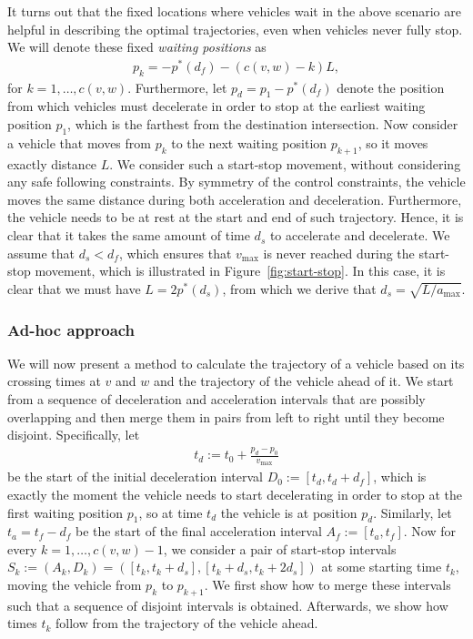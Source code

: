\documentclass[a4paper]{article}
\theoremstyle{definition}
\theoremstyle{plain}
\begin{document}
It turns out that the fixed locations where vehicles wait in the above scenario
are helpful in describing the optimal trajectories, even when vehicles never
fully stop. We will denote these fixed \textit{waiting positions} as
\begin{align*}
  p_{k} = - p^{*}(d_{f}) - (c(v,w) - k) L,
\end{align*}
for $k = 1, \dots, c(v,w)$.
%
Furthermore, let $p_{d} = p_{1} - p^{*}(d_{f})$ denote the position from
which vehicles must decelerate in order to stop at the earliest waiting position
$p_{1}$, which is the farthest from the destination intersection.
%
Now consider a vehicle that moves from $p_{k}$ to the next waiting position
$p_{k+1}$, so it moves exactly distance $L$. We consider such a start-stop
movement, without considering any safe following constraints. By symmetry of the
control constraints, the vehicle moves the same distance during both
acceleration and deceleration. Furthermore, the vehicle needs to be at rest at
the start and end of such trajectory. Hence, it is clear that it takes the same
amount of time $d_{s}$ to accelerate and decelerate. We assume that
$d_{s} < d_{f}$, which ensures that $v_{\max}$ is never reached during the
start-stop movement, which is illustrated in Figure~\ref{fig:start-stop}. In this case, it is
clear that we must have $L = 2 p^{*}(d_{s})$, from which we derive that
$d_{s} = \sqrt{L / a_{\max}}$.

\subsubsection{Ad-hoc approach}
We will now present a method to calculate the trajectory of a vehicle based on
its crossing times at $v$ and $w$ and the trajectory of the vehicle ahead of it.
We start from a sequence of deceleration and acceleration intervals that are
possibly overlapping and then merge them in pairs from left to right until they
become disjoint.
%
Specifically, let
\begin{align*}
  t_{d} := t_{0} + \frac{p_{d} - p_{0}}{v_{\max}}
\end{align*}
be the start of the initial deceleration interval
$D_{0} := [t_{d}, t_{d} + d_{f}]$, which is exactly the moment the vehicle needs
to start decelerating in order to stop at the first waiting position $p_{1}$, so
at time $t_{d}$ the vehicle is at position $p_{d}$. Similarly, let
$t_{a} = t_{f} - d_{f}$ be the start of the final acceleration interval
$A_{f} := [t_{a}, t_{f}]$. Now for every $k = 1, \dots, c(v,w) - 1$, we
consider a pair of start-stop intervals
$S_{k} := (A_{k}, D_{k}) = ([t_{k}, t_{k} + d_{s}], [t_{k} + d_{s}, t_{k} + 2 d_{s}])$
at some starting time $t_{k}$, moving the vehicle from $p_{k}$ to $p_{k+1}$. We
first show how to merge these intervals such that a sequence of disjoint
intervals is obtained. Afterwards, we show how times $t_{k}$ follow from the
trajectory of the vehicle ahead.
\end{document}
